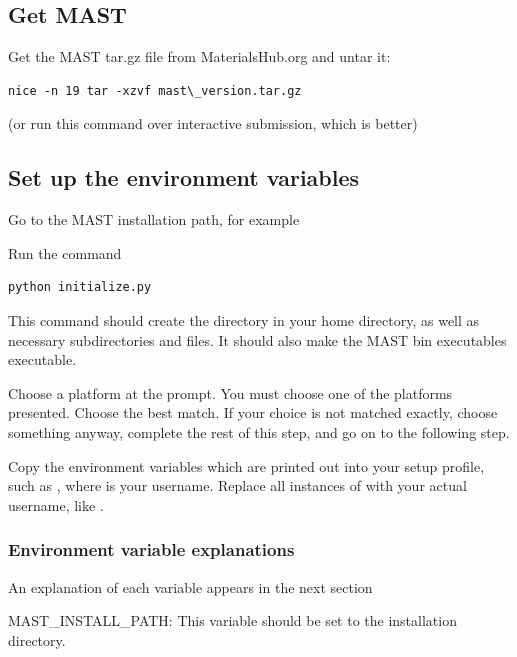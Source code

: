 \documentclass[letterpaper,10pt,english]{sphinxmanual}
\begin{document}
\subsection{Get MAST}
\label{1_0_installation:get-mast}
Get the MAST tar.gz file from MaterialsHub.org and untar it:

\begin{Verbatim}[commandchars=\\\{\}]
nice -n 19 tar -xzvf mast\_version.tar.gz
\end{Verbatim}

(or run this command over interactive submission, which is better)


\subsection{Set up the environment variables}
\label{1_0_installation:set-up-the-environment-variables}
Go to the MAST installation path, for example 

Run the command

\begin{Verbatim}[commandchars=\\\{\}]
python initialize.py
\end{Verbatim}

This command should create the  directory in your home directory, as well as necessary subdirectories and files.
It should also make the MAST bin executables executable.

Choose a platform at the prompt. You must choose one of the platforms presented. Choose the best match. If your choice is not matched exactly, choose something anyway, complete the rest of this step, and go on to the following step.

Copy the environment variables which are printed out into your setup profile, such as , where  is your username. Replace all instances of  with your actual username, like .


\subsubsection{Environment variable explanations}
\label{1_0_installation:environment-variable-explanations}
An explanation of each variable appears in the next section

MAST\_INSTALL\_PATH: This variable should be set to the installation directory.
\end{document}
